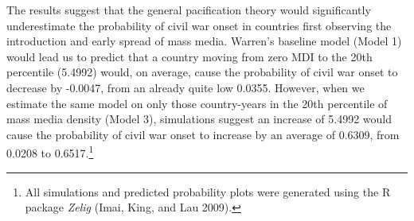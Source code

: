 \documentclass[12pt,article,oneside]{memoir}
\begin{document}
The results suggest that the general pacification theory would
significantly underestimate the probability of civil war onset in
countries first observing the introduction and early spread of mass
media. Warren's baseline model (Model 1) would lead us to predict that a
country moving from zero MDI to the 20th percentile (5.4992) would, on
average, cause the probability of civil war onset to decrease by
-0.0047, from an already quite low 0.0355. However, when we estimate the
same model on only those country-years in the 20th percentile of mass
media density (Model 3), simulations suggest an increase of 5.4992 would
cause the probability of civil war onset to increase by an average of
0.6309, from 0.0208 to 0.6517.\footnote{All simulations and predicted
  probability plots were generated using the R package \emph{Zelig}
  (Imai, King, and Lau 2009).}
\end{document}
